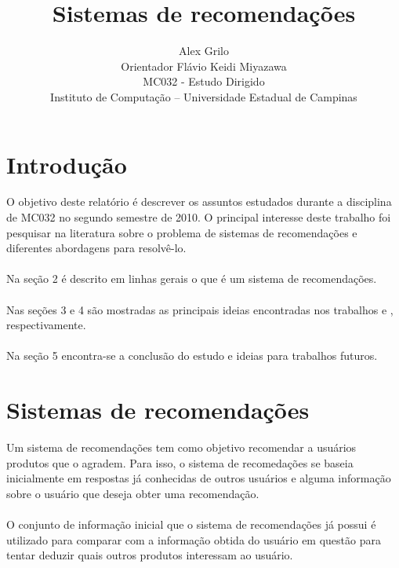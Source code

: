 \documentclass[a4paper,10pt]{article}
\title{Sistemas de recomendações}
\author{Alex Grilo \\ Orientador Flávio Keidi Miyazawa\\ MC032 - Estudo Dirigido \\ \normalsize{Instituto de Computação -- Universidade Estadual de Campinas}}
\begin{document}
\maketitle

\newpage

\tableofcontents

\newpage

\newtheorem{definicao}{Definição}
\newtheorem{lema}{Lema}
\newtheorem{coro}{Corolário}
\newtheorem{teo}{Teorema}

\nocite{golub, saia, papadimitriou, watkins, vempala}
\section{Introdução}

O objetivo deste relatório é descrever os assuntos estudados durante a 
disciplina de MC032 no segundo semestre de 2010. O principal interesse
deste trabalho foi pesquisar na literatura sobre
o problema de sistemas de recomendações e diferentes abordagens para resolvê-lo. \\\\
Na seção 2 é descrito em linhas gerais o que é um sistema de recomendações. \\ \\
Nas seções 3 e 4 são mostradas as
principais ideias encontradas nos trabalhos  \cite{drineas} e \cite{baruch},
respectivamente. \\ \\
Na seção 5 encontra-se a conclusão do estudo e ideias para trabalhos futuros.

\newpage

\section{Sistemas de recomendações}\label{sec:sitemas_rec}{}

Um sistema de recomendações tem como objetivo recomendar a usuários
produtos que o agradem. Para isso, o sistema de recomedações se baseia
inicialmente em respostas já conhecidas de outros usuários e alguma
informação sobre o usuário que deseja obter uma recomendação. \\ \\
O conjunto de informação inicial que o sistema de recomendações já
possui é utilizado para comparar com a informação obtida do usuário
em questão para tentar deduzir quais outros produtos interessam
ao usuário. 


\newpage
\end{document}
